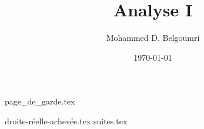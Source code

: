 \documentclass[12pt, a4paper]{report}
\author{Mohammed D. Belgoumri}
\title{Analyse I}
\date{\today}
\theoremstyle{definition}
\theoremstyle{remark}
\begin{document}
    {page_de_garde.tex}
    \tableofcontents
    {droite-réelle-achevée.tex}
    {suites.tex}
\end{document}
